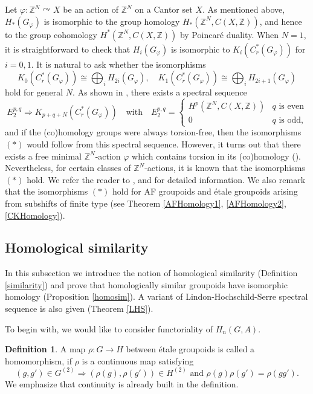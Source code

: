\documentclass[11pt]{article}
\theoremstyle{definition}
\newtheorem{df}[thm]{Definition}
\renewcommand{\phi}{\varphi}
\newcommand{\Z}{\mathbb{Z}}
\begin{document}
Let $\phi:\Z^N\curvearrowright X$ be an action of $\Z^N$ on a Cantor set $X$. 
As mentioned above, 
$H_*(G_\phi)$ is isomorphic to the group homology $H_*(\Z^N,C(X,\Z))$, 
and hence to the group cohomology $H^*(\Z^N,C(X,\Z))$ by Poincar\'e duality. 
When $N=1$, 
it is straightforward to check that 
$H_i(G_\phi)$ is isomorphic to $K_i(C^*_r(G_\phi))$ for $i=0,1$. 
It is natural to ask whether the isomorphisms 
\[
K_0(C^*_r(G_\phi))\cong\bigoplus_iH_{2i}(G_\phi),\quad 
K_1(C^*_r(G_\phi))\cong\bigoplus_iH_{2i+1}(G_\phi)
\tag{$*$}
\]
hold for general $N$. 
As shown in \cite{FH}, there exists a spectral sequence 
\[
E_2^{p,q}\Rightarrow K_{p+q+N}(C^*_r(G_\phi))\quad\text{with}\quad
E_2^{p,q}=\begin{cases}H^p(\Z^N,C(X,\Z))&q\text{ is even} \\
0&q\text{ is odd,}\end{cases}
\]
and if the (co)homology groups were always torsion-free, then 
the isomorphisms $(*)$ would follow from this spectral sequence. 
However, it turns out that 
there exists a free minimal $\Z^N$-action $\phi$ 
which contains torsion in its (co)homology (\cite{GHK,Mtc}). 
Nevertheless, for certain classes of $\Z^N$-actions, 
it is known that the isomorphisms $(*)$ hold. 
We refer the reader to \cite{AP}, \cite{GHK} and \cite{SB} 
for detailed information. 
We also remark that 
the isomorphisms $(*)$ hold for AF groupoids and \'etale groupoids 
arising from subshifts of finite type 
(see Theorem \ref{AFHomology1}, \ref{AFHomology2}, \ref{CKHomology}). 


\subsection{Homological similarity}

In this subsection we introduce the notion of homological similarity 
(Definition \ref{similarity}) and 
prove that homologically similar groupoids have isomorphic homology 
(Proposition \ref{homosim}). 
A variant of Lindon-Hochschild-Serre spectral sequence is also given 
(Theorem \ref{LHS}). 

To begin with, we would like to consider functoriality of $H_n(G,A)$. 

\begin{df}
A map $\rho:G\to H$ between \'etale groupoids is called a homomorphism, 
if $\rho$ is a continuous map satisfying 
\[
(g,g')\in G^{(2)}\Rightarrow
(\rho(g),\rho(g'))\in H^{(2)}\text{ and }
\rho(g)\rho(g')=\rho(gg'). 
\]
We emphasize that continuity is already built in the definition. 
\end{df}
\end{document}
